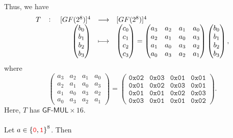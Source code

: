 \newpage
\noindent Thus, we have \[
\fullfunction{T}{[GF(2^8)]^4}{[GF(2^8)]^4}{\begin{pmatrix}
	b_0 \\ b_1 \\ b_2 \\ b_3
\end{pmatrix}}{\begin{pmatrix}
	c_0 \\ c_1 \\ c_2 \\ c_3
\end{pmatrix}=\begin{pmatrix}
a_3 & a_2 & a_1 & a_0 \\
a_2 & a_1 & a_0 & a_3 \\
a_1 & a_0 & a_3 & a_2 \\
a_0 & a_3 & a_2 & a_1
\end{pmatrix}\begin{pmatrix}
b_0 \\ b_1 \\ b_2 \\ b_3
\end{pmatrix},}
\] where \[
\begin{pmatrix}
	a_3 & a_2 & a_1 & a_0 \\
	a_2 & a_1 & a_0 & a_3 \\
	a_1 & a_0 & a_3 & a_2 \\
	a_0 & a_3 & a_2 & a_1
\end{pmatrix} = \begin{pmatrix}
\texttt{0x02} & \texttt{0x03} & \texttt{0x01} & \texttt{0x01}\\
\texttt{0x01} & \texttt{0x02} & \texttt{0x03} & \texttt{0x01}\\
\texttt{0x01} & \texttt{0x01} & \texttt{0x02} & \texttt{0x03}\\
\texttt{0x03} & \texttt{0x01} & \texttt{0x01} & \texttt{0x02}
\end{pmatrix}.
\] Here, $T$ has $\textsf{GF-MUL}\times 16$.\\
\ \\
\noindent Let $a\in\set{\textcolor{red}{\texttt{0}},\textcolor{red}{\texttt{1}}}^8$. Then
